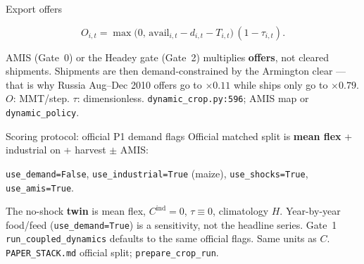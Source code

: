 \begin{frame}{Export offers}

\[
O_{i,t}
= \max\bigl(0,\, \mathrm{avail}_{i,t}-d_{i,t}-T_{i,t}\bigr)\,(1-\tau_{i,t}).
\]

AMIS (Gate~0) or the Headey gate (Gate~2) multiplies \textbf{offers}, not
cleared shipments. Shipments are then demand-constrained by the Armington
clear --- that is why Russia Aug--Dec 2010 offers go to $\times 0.11$ while
ships only go to $\times 0.79$.
{$O$: MMT/step. $\tau$: dimensionless.}
{\texttt{dynamic\_crop.py:596}; AMIS map or \texttt{dynamic\_policy}.}
\end{frame}

\begin{frame}{Scoring protocol: official P1 demand flags}
Official matched split is \textbf{mean flex} + industrial on + harvest
$\pm$ AMIS:

\begin{center}
\texttt{use\_demand=False}, \quad
\texttt{use\_industrial=True} (maize), \quad
\texttt{use\_shocks=True}, \quad
\texttt{use\_amis=True}.
\end{center}

The no-shock \textbf{twin} is mean flex, $C^{\mathrm{ind}}=0$,
$\tau\equiv 0$, climatology $H$. Year-by-year food/feed
(\texttt{use\_demand=True}) is a sensitivity, not the headline series.
Gate~1 \texttt{run\_coupled\_dynamics} defaults to the same official flags.
{Same units as $C$.}
{\texttt{PAPER\_STACK.md} official split; \texttt{prepare\_crop\_run}.}
\end{frame}

